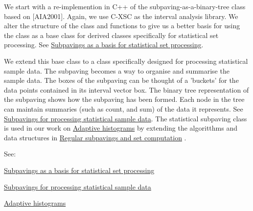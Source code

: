 \-We start with a re-\/implemention in \-C++ of the subpaving-\/as-\/a-\/binary-\/tree class based on \mbox{[}\-A\-I\-A2001\mbox{]}. \-Again, we use \-C-\/\-X\-S\-C as the interval analysis library. \-We alter the structure of the class and functions to give us a better basis for using the class as a base class for derived classes specifically for statistical set processing. \-See \hyperlink{newsubpavings}{\-Subpavings as a basis for statistical set processing}.

\-We extend this base class to a class specifically designed for processing statistical sample data. \-The subpaving becomes a way to organise and summarise the sample data. \-The boxes of the subpaving can be thought of a 'buckets' for the data points contained in its interval vector box. \-The binary tree representation of the subpaving shows how the subpaving has been formed. \-Each node in the tree can maintain summaries (such as count, and sum) of the data it represents. \-See \hyperlink{StatsSubPavings}{\-Subpavings for processing statistical sample data}. \-The statistical subpaving class is used in our work on \hyperlink{AdaptiveHistograms}{\-Adaptive histograms} by extending the algoritthms and data structures in \hyperlink{pavproc_setcomputation}{\-Regular subpavings and set computation} .

\-See\-:
\begin{DoxyItemize}
\item \hyperlink{newsubpavings}{\-Subpavings as a basis for statistical set processing}
\item \hyperlink{StatsSubPavings}{\-Subpavings for processing statistical sample data}
\item \hyperlink{AdaptiveHistograms}{\-Adaptive histograms} 
\end{DoxyItemize}